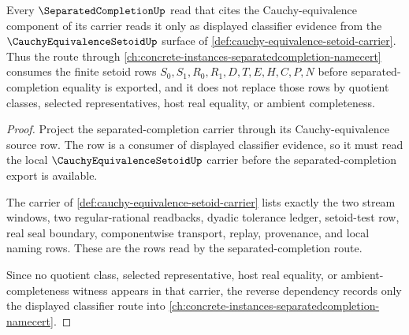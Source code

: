 \begin{theorem}
\label{thm:cauchy-equivalence-setoid-separated-completion-reverse-dependency}
Every $\SeparatedCompletionUp$ read that cites the Cauchy-equivalence component of its carrier reads it only as displayed classifier evidence from the $\CauchyEquivalenceSetoidUp$ surface of \autoref{def:cauchy-equivalence-setoid-carrier}. Thus the route through \autoref{ch:concrete-instances-separatedcompletion-namecert} consumes the finite setoid rows $S_0,S_1,R_0,R_1,D,T,E,H,C,P,N$ before separated-completion equality is exported, and it does not replace those rows by quotient classes, selected representatives, host real equality, or ambient completeness.
\end{theorem}
\begin{proof}
Project the separated-completion carrier through its Cauchy-equivalence source row. The row is a consumer of displayed classifier evidence, so it must read the local $\CauchyEquivalenceSetoidUp$ carrier before the separated-completion export is available.

The carrier of \autoref{def:cauchy-equivalence-setoid-carrier} lists exactly the two stream windows, two regular-rational readbacks, dyadic tolerance ledger, setoid-test row, real seal boundary, componentwise transport, replay, provenance, and local naming rows. These are the rows read by the separated-completion route.

Since no quotient class, selected representative, host real equality, or ambient-completeness witness appears in that carrier, the reverse dependency records only the displayed classifier route into \autoref{ch:concrete-instances-separatedcompletion-namecert}.
\end{proof}
